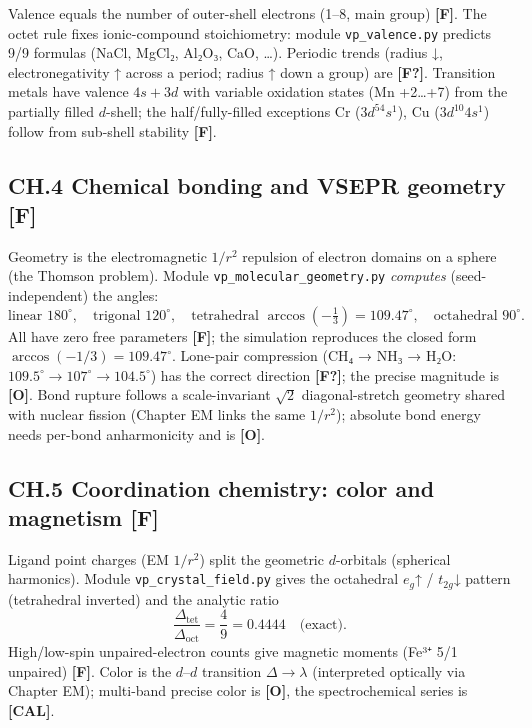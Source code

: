 \documentclass[
  10pt,
]{article}
\begin{document}
Valence equals the number of outer-shell electrons (1--8, main group)
\textbf{{[}F{]}}. The octet rule fixes ionic-compound stoichiometry:
module \texttt{vp\_valence.py} predicts 9/9 formulas (NaCl, MgCl₂,
Al₂O₃, CaO, \ldots). Periodic trends (radius ↓, electronegativity ↑
across a period; radius ↑ down a group) are \textbf{{[}F?{]}}.
Transition metals have valence \(4s+3d\) with variable oxidation states
(Mn +2\ldots+7) from the partially filled \(d\)-shell; the
half/fully-filled exceptions Cr (\(3d^54s^1\)), Cu (\(3d^{10}4s^1\))
follow from sub-shell stability \textbf{{[}F{]}}.

\hypertarget{ch.4-chemical-bonding-and-vsepr-geometry-f}{%
\subsection{\texorpdfstring{CH.4 Chemical bonding and VSEPR geometry
\textbf{{[}F{]}}}{CH.4 Chemical bonding and VSEPR geometry {[}F{]}}}\label{ch.4-chemical-bonding-and-vsepr-geometry-f}}

Geometry is the electromagnetic \(1/r^2\) repulsion of electron domains
on a sphere (the Thomson problem). Module
\texttt{vp\_molecular\_geometry.py} \emph{computes} (seed-independent)
the angles:
\[ \text{linear } 180^\circ,\quad \text{trigonal } 120^\circ,\quad
   \boxed{\text{tetrahedral } \arccos(-\tfrac13) = 109.47^\circ},\quad \text{octahedral } 90^\circ. \]
All have zero free parameters \textbf{{[}F{]}}; the simulation
reproduces the closed form \(\arccos(-1/3)=109.47^\circ\). Lone-pair
compression (CH₄ → NH₃ → H₂O:
\(109.5^\circ \to 107^\circ \to 104.5^\circ\)) has the correct direction
\textbf{{[}F?{]}}; the precise magnitude is \textbf{{[}O{]}}. Bond
rupture follows a scale-invariant \(\sqrt2\) diagonal-stretch geometry
shared with nuclear fission (Chapter EM links the same \(1/r^2\));
absolute bond energy needs per-bond anharmonicity and is
\textbf{{[}O{]}}.

\hypertarget{ch.5-coordination-chemistry-color-and-magnetism-f}{%
\subsection{\texorpdfstring{CH.5 Coordination chemistry: color and
magnetism
\textbf{{[}F{]}}}{CH.5 Coordination chemistry: color and magnetism {[}F{]}}}\label{ch.5-coordination-chemistry-color-and-magnetism-f}}

Ligand point charges (EM \(1/r^2\)) split the geometric \(d\)-orbitals
(spherical harmonics). Module \texttt{vp\_crystal\_field.py} gives the
octahedral \(e_g\)↑ / \(t_{2g}\)↓ pattern (tetrahedral inverted) and the
analytic ratio
\[ \frac{\Delta_{\text{tet}}}{\Delta_{\text{oct}}} = \frac{4}{9} = 0.4444 \quad\text{(exact)}. \]
High/low-spin unpaired-electron counts give magnetic moments (Fe³⁺ 5/1
unpaired) \textbf{{[}F{]}}. Color is the \(d\)--\(d\) transition
\(\Delta \to \lambda\) (interpreted optically via Chapter EM);
multi-band precise color is \textbf{{[}O{]}}, the spectrochemical series
is \textbf{{[}CAL{]}}.
\end{document}
